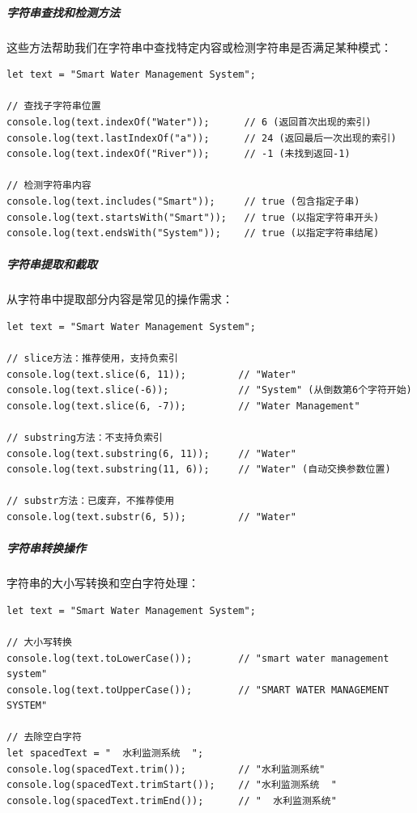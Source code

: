 \hypertarget{ux5b57ux7b26ux4e32ux67e5ux627eux548cux68c0ux6d4bux65b9ux6cd5}{%
\subparagraph{字符串查找和检测方法}\label{ux5b57ux7b26ux4e32ux67e5ux627eux548cux68c0ux6d4bux65b9ux6cd5}}

这些方法帮助我们在字符串中查找特定内容或检测字符串是否满足某种模式：

\begin{lstlisting}[style=javascript]
let text = "Smart Water Management System";

// 查找子字符串位置
console.log(text.indexOf("Water"));      // 6 (返回首次出现的索引)
console.log(text.lastIndexOf("a"));      // 24 (返回最后一次出现的索引)
console.log(text.indexOf("River"));      // -1 (未找到返回-1)

// 检测字符串内容
console.log(text.includes("Smart"));     // true (包含指定子串)
console.log(text.startsWith("Smart"));   // true (以指定字符串开头)
console.log(text.endsWith("System"));    // true (以指定字符串结尾)
\end{lstlisting}

\hypertarget{ux5b57ux7b26ux4e32ux63d0ux53d6ux548cux622aux53d6}{%
\subparagraph{字符串提取和截取}\label{ux5b57ux7b26ux4e32ux63d0ux53d6ux548cux622aux53d6}}

从字符串中提取部分内容是常见的操作需求：

\begin{lstlisting}[style=javascript]
let text = "Smart Water Management System";

// slice方法：推荐使用，支持负索引
console.log(text.slice(6, 11));         // "Water"
console.log(text.slice(-6));            // "System" (从倒数第6个字符开始)
console.log(text.slice(6, -7));         // "Water Management"

// substring方法：不支持负索引
console.log(text.substring(6, 11));     // "Water"
console.log(text.substring(11, 6));     // "Water" (自动交换参数位置)

// substr方法：已废弃，不推荐使用
console.log(text.substr(6, 5));         // "Water"
\end{lstlisting}

\hypertarget{ux5b57ux7b26ux4e32ux8f6cux6362ux64cdux4f5c}{%
\subparagraph{字符串转换操作}\label{ux5b57ux7b26ux4e32ux8f6cux6362ux64cdux4f5c}}

字符串的大小写转换和空白字符处理：

\begin{lstlisting}[style=javascript]
let text = "Smart Water Management System";

// 大小写转换
console.log(text.toLowerCase());        // "smart water management system"
console.log(text.toUpperCase());        // "SMART WATER MANAGEMENT SYSTEM"

// 去除空白字符
let spacedText = "  水利监测系统  ";
console.log(spacedText.trim());         // "水利监测系统"
console.log(spacedText.trimStart());    // "水利监测系统  "
console.log(spacedText.trimEnd());      // "  水利监测系统"
\end{lstlisting}

